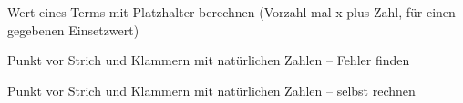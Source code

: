 \begin{aufgabe}{Wert eines Terms mit Platzhalter berechnen (Vorzahl mal x plus Zahl, für einen gegebenen Einsetzwert)}
\end{aufgabe}

\begin{aufgabe}{Punkt vor Strich und Klammern mit natürlichen Zahlen – Fehler finden}
\end{aufgabe}

\begin{aufgabe}{Punkt vor Strich und Klammern mit natürlichen Zahlen – selbst rechnen}
\end{aufgabe}
